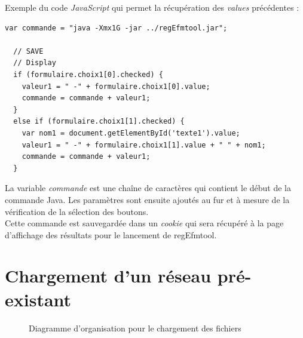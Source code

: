 Exemple du code \emph{JavaScript} qui permet la récupération des \textit{values} précédentes : \\

\begin{DDbox}{\linewidth}
\begin{lstlisting}
var commande = "java -Xmx1G -jar ../regEfmtool.jar";

  // SAVE
  // Display
  if (formulaire.choix1[0].checked) { 
    valeur1 = " -" + formulaire.choix1[0].value; 
    commande = commande + valeur1;
  }
  else if (formulaire.choix1[1].checked) { 
    var nom1 = document.getElementById('texte1').value;
    valeur1 = " -" + formulaire.choix1[1].value + " " + nom1; 
    commande = commande + valeur1;
  }
\end{lstlisting}
\end{DDbox}

La variable \textit{commande} est une chaîne de caractères qui contient le début de la commande Java. Les paramètres sont ensuite ajoutés au fur et à mesure de la vérification de la sélection des boutons. \\

Cette commande est sauvegardée dans un \textit{cookie} qui sera récupéré à la page d'affichage des résultats pour le lancement de regEfmtool. 

\section{Chargement d'un réseau pré-existant}

\begin{figure}[!ht]
	\begin{center}
		\caption{Diagramme d'organisation pour le chargement des fichiers}
  		\label{DiagLoad}
  	\end{center}	
\end{figure}

